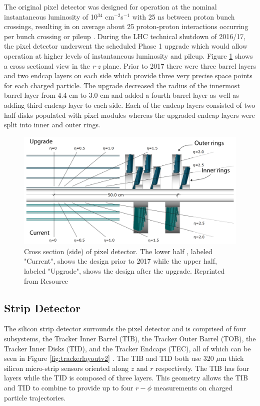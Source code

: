 The original pixel detector was designed for operation at the nominal instantaneous luminosity of 10$^{34}$ cm$^{-2}$s$^{-1}$ with 25 ns between proton bunch crossings, resulting in on average about 25 proton-proton interactions occurring per bunch crossing or pileup \cite{Chatrchyan:1704291}.  During the LHC technical shutdown of 2016/17, the pixel detector underwent the scheduled Phase 1 upgrade which would allow operation at higher levels of instantaneous luminosity and pileup.  Figure \ref{fig:trackersideview} shows a cross sectional view in the \textit{r-z} plane.  Prior to 2017 there were three barrel layers and two endcap layers on each side which provide three very precise space points for each charged particle.  The upgrade decreased the radius of the innermost barrel layer from 4.4 cm to 3.0 cm and added a fourth barrel layer as well as adding third endcap layer to each side.  Each of the endcap layers consisted of two half-disks populated with pixel modules whereas the upgraded endcap layers were split into inner and outer rings. \cite{Dominguez:1481838}

\begin{figure}[h]
	\centering
	\includegraphics[width=0.7\linewidth]{Figures/Tracker_sideview}
	\caption{Cross section (side) of pixel detector. The lower half , labeled "Current", shows the design prior to 2017 while the upper half, labeled "Upgrade", shows the design after the upgrade. Reprinted from Resource \cite{Dominguez:1481838}}
	\label{fig:trackersideview}
\end{figure}

\subsection{Strip Detector}
The silicon strip detector surrounds the pixel detector and is comprised of four subsystems, the Tracker Inner Barrel (TIB), the Tracker Outer Barrel (TOB), the Tracker Inner Disks (TID), and the Tracker Endcaps (TEC), all of which can be seen in Figure \ref{fig:trackerlayoutv2} \cite{Collaboration_2008}. The TIB and TID both use 320 $\mu$m thick silicon micro-strip sensors oriented along $z$ and $r$ respectively.  The TIB has four layers while the TID is composed of three layers.  This geometry allows the TIB and TID to combine to provide up to four $r-\phi$ measurements on charged particle trajectories.

